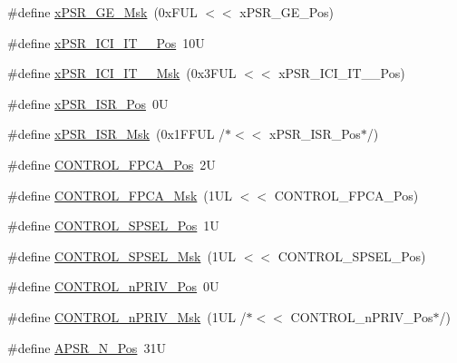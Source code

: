 \begin{DoxyCompactItemize}
\#define \mbox{\hyperlink{group___c_m_s_i_s___c_o_r_e_ga967634e605d013e9b07002eca31f7903}{x\+P\+S\+R\+\_\+\+G\+E\+\_\+\+Msk}}~(0x\+F\+U\+L $<$$<$ x\+P\+S\+R\+\_\+\+G\+E\+\_\+\+Pos)
\item 
\#define \mbox{\hyperlink{group___c_m_s_i_s___c_o_r_e_gafdcd08cbd7116d65ae1a5b8182dc55ae}{x\+P\+S\+R\+\_\+\+I\+C\+I\+\_\+\+I\+T\+\_\+\_\+\+Pos}}~10U
\item 
\#define \mbox{\hyperlink{group___c_m_s_i_s___c_o_r_e_gae98918458d70d79b32ce200b55ffe744}{x\+P\+S\+R\+\_\+\+I\+C\+I\+\_\+\+I\+T\+\_\+\_\+\+Msk}}~(0x3\+F\+U\+L $<$$<$ x\+P\+S\+R\+\_\+\+I\+C\+I\+\_\+\+I\+T\+\_\+\_\+\+Pos)
\item 
\#define \mbox{\hyperlink{group___c_m_s_i_s___c_o_r_e_ga21bff245fb1aef9683f693d9d7bb2233}{x\+P\+S\+R\+\_\+\+I\+S\+R\+\_\+\+Pos}}~0U
\item 
\#define \mbox{\hyperlink{group___c_m_s_i_s___c_o_r_e_gadf8eed87e0081dfe1ef1c78a0ea91afd}{x\+P\+S\+R\+\_\+\+I\+S\+R\+\_\+\+Msk}}~(0x1\+F\+F\+U\+L /$\ast$$<$$<$ x\+P\+S\+R\+\_\+\+I\+S\+R\+\_\+\+Pos$\ast$/)
\item 
\#define \mbox{\hyperlink{group___c_m_s_i_s___c_o_r_e_gac7018b59b07134c5363b33eb94918a58}{C\+O\+N\+T\+R\+O\+L\+\_\+\+F\+P\+C\+A\+\_\+\+Pos}}~2U
\item 
\#define \mbox{\hyperlink{group___c_m_s_i_s___c_o_r_e_gad20bb0212b2e1864f24af38d93587c79}{C\+O\+N\+T\+R\+O\+L\+\_\+\+F\+P\+C\+A\+\_\+\+Msk}}~(1\+U\+L $<$$<$ C\+O\+N\+T\+R\+O\+L\+\_\+\+F\+P\+C\+A\+\_\+\+Pos)
\item 
\#define \mbox{\hyperlink{group___c_m_s_i_s___c_o_r_e_ga07eafc53e609895342c6a530e9d01310}{C\+O\+N\+T\+R\+O\+L\+\_\+\+S\+P\+S\+E\+L\+\_\+\+Pos}}~1U
\item 
\#define \mbox{\hyperlink{group___c_m_s_i_s___c_o_r_e_ga70b29840969b06909da21369b0b05b53}{C\+O\+N\+T\+R\+O\+L\+\_\+\+S\+P\+S\+E\+L\+\_\+\+Msk}}~(1\+U\+L $<$$<$ C\+O\+N\+T\+R\+O\+L\+\_\+\+S\+P\+S\+E\+L\+\_\+\+Pos)
\item 
\#define \mbox{\hyperlink{group___c_m_s_i_s___c_o_r_e_ga51b95bc03ec0d815b459bde0b14a5908}{C\+O\+N\+T\+R\+O\+L\+\_\+n\+P\+R\+I\+V\+\_\+\+Pos}}~0U
\item 
\#define \mbox{\hyperlink{group___c_m_s_i_s___c_o_r_e_gaef3b20d77acb213338f89ce5e7bc36b0}{C\+O\+N\+T\+R\+O\+L\+\_\+n\+P\+R\+I\+V\+\_\+\+Msk}}~(1\+U\+L /$\ast$$<$$<$ C\+O\+N\+T\+R\+O\+L\+\_\+n\+P\+R\+I\+V\+\_\+\+Pos$\ast$/)
\item 
\#define \mbox{\hyperlink{group___c_m_s_i_s___c_o_r_e_gac469528d210043c7bd3f12f0e6824766}{A\+P\+S\+R\+\_\+\+N\+\_\+\+Pos}}~31U

\end{DoxyCompactItemize}
